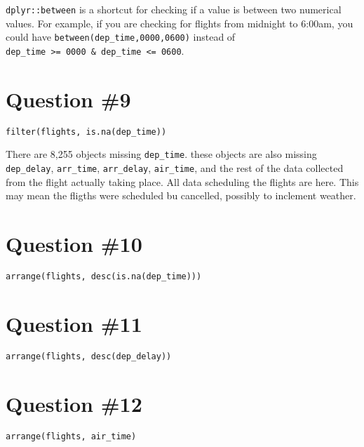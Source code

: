 \documentclass[]{article}
\begin{document}
\texttt{dplyr::between} is a shortcut for checking if a value is between
two numerical values. For example, if you are checking for flights from
midnight to 6:00am, you could have \texttt{between(dep\_time,0000,0600)}
instead of
\texttt{dep\_time\ \textgreater{}=\ 0000\ \&\ dep\_time\ \textless{}=\ 0600}.

\section{Question \#9}\label{question-9}

\begin{verbatim}
filter(flights, is.na(dep_time))
\end{verbatim}

There are 8,255 objects missing \texttt{dep\_time}. these objects are
also missing \texttt{dep\_delay}, \texttt{arr\_time},
\texttt{arr\_delay}, \texttt{air\_time}, and the rest of the data
collected from the flight actually taking place. All data scheduling the
flights are here. This may mean the fligths were scheduled bu cancelled,
possibly to inclement weather.

\section{Question \#10}\label{question-10}

\begin{verbatim}
arrange(flights, desc(is.na(dep_time)))
\end{verbatim}

\section{Question \#11}\label{question-11}

\begin{verbatim}
arrange(flights, desc(dep_delay))
\end{verbatim}

\section{Question \#12}\label{question-12}

\begin{verbatim}
arrange(flights, air_time)
\end{verbatim}
\end{document}
